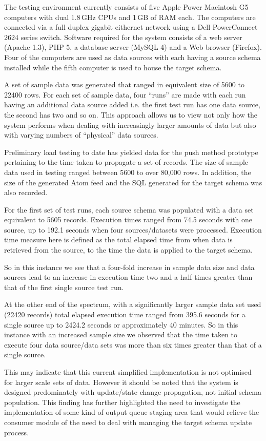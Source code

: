\documentclass{CRPITStyle}
\begin{document}
The testing environment currently consists of five Apple Power Macintosh
G5 computers with dual 1.8\,GHz CPUs and 1\,GB of RAM each. The
computers are connected via a full duplex gigabit eithernet network
using a Dell PowerConnect 2624 series switch. Software required for the
system consists of a web server (Apache 1.3), PHP 5, a database server
(MySQL 4) and a Web browser (Firefox). Four of the computers are used as
data sources with each having a source schema installed while the fifth
computer is used to house the target schema.

A set of sample data was generated that ranged in equivalent size of
5600 to 22400 rows. For each set of sample data, four ``runs'' are made
with each run having an additional data source added i.e. the first test
run has one data source, the second has two and so on. This approach
allows us to view not only how the system performs when dealing with
increasingly larger amounts of data but also with varying numbers of
``physical'' data sources.

Preliminary load testing to date has yielded data for the push method
prototype pertaining to the time taken to propagate a set of records.
The size of sample data used in testing ranged between 5600 to over 
80,000 rows. In addition, the size of the generated Atom feed and the 
SQL generated for the target schema was also recorded.

For the first set of test runs, each source schema was populated with a
data set equivalent to 5605 records. Execution times ranged from 74.5
seconds with one source, up to 192.1 seconds when four sources/datasets
were processed. Execution time measure here is defined as the total
elapsed time from when data is retrieved from the source, to the time
the data is applied to the target schema.

So in this instance we see that a four-fold increase in sample data size
and data sources lead to an increase in execution time two and a half
times greater than that of the first single source test run.

At the other end of the spectrum, with a significantly larger sample
data set used (22420 records) total elapsed execution time ranged from
395.6 seconds for a single source up to 2424.2 seconds or approximately
40 minutes. So in this instance with an increased sample size we
observed that the time taken to execute four data source/data sets was
more than six times greater than that of a single source.

This may indicate that this current simplified implementation is not
optimised for larger scale sets of data. However it should be noted that
the system is designed predominately with update/state change
propagation, not initial schema population. This finding has further
highlighted the need to investigate the implementation of some kind of
output queue staging area that would relieve the consumer module of the
need to deal with managing the target schema update process.
\end{document}
